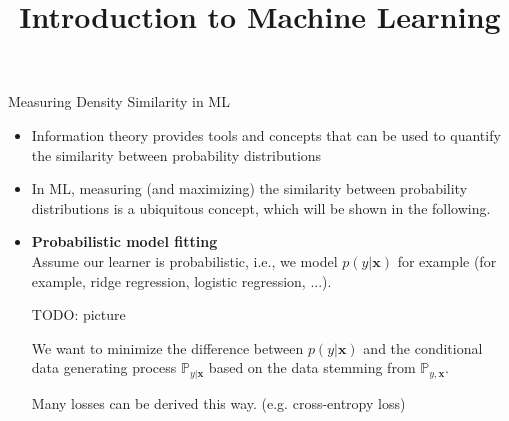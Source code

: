 \documentclass[11pt,compress,t,notes=noshow, xcolor=table]{beamer}
\title{Introduction to Machine Learning}
\date{}
\begin{document}

\begin{vbframe} {Measuring Density Similarity in ML}
\begin{itemize}
    \item Information theory provides tools and concepts that can be used to quantify the similarity between probability distributions
\item In ML, measuring (and maximizing) the similarity between probability distributions is a ubiquitous concept, which will be shown in the following.
\end{itemize}
\framebreak
\begin{itemize}
    \item \textbf{Probabilistic model fitting}\\
Assume our learner is probabilistic, i.e., we model $p(y| \mathbf{x})$ for example (for example, ridge regression, logistic regression, ...).

\lz 

TODO: picture

\lz 

We want to minimize the difference between $p(y \vert \mathbf{x})$ and the conditional data generating process $\mathbb{P}_{y\vert\mathbf{x}}$ based on the data stemming from $\mathbb{P}_{y, \mathbf{x}}.$

\lz

Many losses can be derived this way. (e.g. cross-entropy loss)

\end{itemize}

\framebreak


\end{vbframe}
\end{document}

